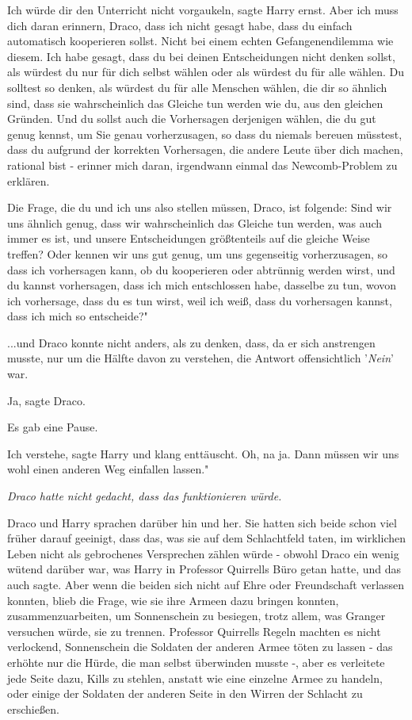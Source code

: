 \glqq Ich würde dir den Unterricht nicht vorgaukeln\grqq{}, sagte Harry ernst.
\glqq Aber ich muss dich daran erinnern, Draco, dass ich nicht gesagt habe, dass
du einfach automatisch kooperieren sollst. Nicht bei einem echten
Gefangenendilemma wie diesem. Ich habe gesagt, dass du bei deinen Entscheidungen
nicht denken sollst, als würdest du nur für dich selbst wählen oder als würdest
du für alle wählen. Du solltest so denken, als würdest du für alle Menschen
wählen, die dir so ähnlich sind, dass sie wahrscheinlich das Gleiche tun werden
wie du, aus den gleichen Gründen. Und du sollst auch die Vorhersagen derjenigen
wählen, die du gut genug kennst, um Sie genau vorherzusagen, so dass du niemals
bereuen müsstest, dass du aufgrund der korrekten Vorhersagen, die andere Leute
über dich machen, rational bist - erinner mich daran, irgendwann einmal das
Newcomb-Problem zu erklären.

Die Frage, die du und ich uns also stellen müssen, Draco, ist folgende: Sind wir
uns ähnlich genug, dass wir wahrscheinlich das Gleiche tun werden, was auch
immer es ist, und unsere Entscheidungen größtenteils auf die gleiche Weise
treffen? Oder kennen wir uns gut genug, um uns gegenseitig vorherzusagen, so
dass ich vorhersagen kann, ob du kooperieren oder abtrünnig werden wirst, und du
kannst vorhersagen, dass ich mich entschlossen habe, dasselbe zu tun, wovon ich
vorhersage, dass du es tun wirst, weil ich weiß, dass du vorhersagen kannst,
dass ich mich so entscheide?"

...und Draco konnte nicht anders, als zu denken, dass, da er sich anstrengen
musste, nur um die Hälfte davon zu verstehen, die Antwort offensichtlich
'\emph{Nein}' war.

\glqq Ja\grqq{}, sagte Draco.

Es gab eine Pause.

\glqq Ich verstehe\grqq{}, sagte Harry und klang enttäuscht. \glqq Oh, na ja.
Dann müssen wir uns wohl einen anderen Weg einfallen lassen."

\emph{ Draco hatte nicht gedacht, dass das funktionieren würde.}

Draco und Harry sprachen darüber hin und her. Sie hatten sich beide schon viel
früher darauf geeinigt, dass das, was sie auf dem Schlachtfeld taten, im
wirklichen Leben nicht als gebrochenes Versprechen zählen würde - obwohl Draco
ein wenig wütend darüber war, was Harry in Professor Quirrells Büro getan hatte,
und das auch sagte. Aber wenn die beiden sich nicht auf Ehre oder Freundschaft
verlassen konnten, blieb die Frage, wie sie ihre Armeen dazu bringen konnten,
zusammenzuarbeiten, um Sonnenschein zu besiegen, trotz allem, was Granger
versuchen würde, sie zu trennen. Professor Quirrells Regeln machten es nicht
verlockend, Sonnenschein die Soldaten der anderen Armee töten zu lassen - das
erhöhte nur die Hürde, die man selbst überwinden musste -, aber es verleitete
jede Seite dazu, Kills zu stehlen, anstatt wie eine einzelne Armee zu handeln,
oder einige der Soldaten der anderen Seite in den Wirren der Schlacht zu
erschießen.


